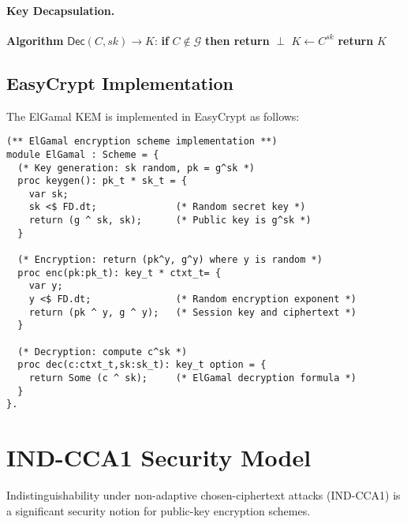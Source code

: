 \paragraph{Key Decapsulation.}
\begin{algorithmic}[1]
\STATE \textbf{Algorithm} $\mathsf{Dec}(C, sk) \rightarrow K$:
\STATE \textbf{if} $C \notin \mathcal{G}$ \textbf{then return} $\perp$
\STATE $K \leftarrow C^{sk}$ 
\STATE \textbf{return} $K$
\end{algorithmic}

\subsection{EasyCrypt Implementation}

The ElGamal KEM is implemented in EasyCrypt as follows:

\begin{lstlisting}[style=easycrypt, caption=ElGamal KEM Implementation in EasyCrypt, breaklines=true, breakatwhitespace=true, frame=single, keepspaces=true]
(** ElGamal encryption scheme implementation **)
module ElGamal : Scheme = {
  (* Key generation: sk random, pk = g^sk *)
  proc keygen(): pk_t * sk_t = {
    var sk;
    sk <$ FD.dt;              (* Random secret key *)
    return (g ^ sk, sk);      (* Public key is g^sk *)
  }

  (* Encryption: return (pk^y, g^y) where y is random *)
  proc enc(pk:pk_t): key_t * ctxt_t= {
    var y;
    y <$ FD.dt;               (* Random encryption exponent *)
    return (pk ^ y, g ^ y);   (* Session key and ciphertext *)
  }
  
  (* Decryption: compute c^sk *)
  proc dec(c:ctxt_t,sk:sk_t): key_t option = {
    return Some (c ^ sk);     (* ElGamal decryption formula *)
  }
}.
\end{lstlisting}

\section{IND-CCA1 Security Model}
\label{sec:ind-cca1-model}

Indistinguishability under non-adaptive chosen-ciphertext attacks (IND-CCA1) is a significant security notion for public-key encryption schemes.

